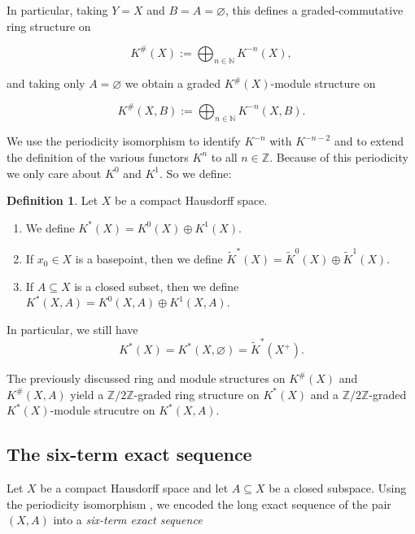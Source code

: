 \documentclass[12pt,a4paper]{amsart}
\theoremstyle{plain}
\theoremstyle{definition}
\newtheorem{defn}[thm]{Definition}
\theoremstyle{remark}
\begin{document}
In particular, taking $Y = X$ and $B = A = \varnothing$, this defines a graded-commutative ring structure on

\[ K^{\#}(X) := \bigoplus_{n \in \mathbb{N}} K^{-n}(X), \]

and taking only $A = \varnothing$ we obtain a graded $K^{\#}(X)$-module structure on

\[ K^{\#}(X,B) := \bigoplus_{n \in \mathbb{N}} K^{-n}(X,B). \]

We use the periodicity isomorphism \cite[Theorem 2.4.9]{ati67} to identify $K^{-n}$ with $K^{-n-2}$ and to extend the definition of the various functors $K^{n}$ to all $n \in \mathbb{Z}$.
Because of this periodicity we only care about $K^{0}$ and $K^{1}$.
So we define:

\begin{defn}
  Let $X$ be a compact Hausdorff space.
  \begin{enumerate}
    \item We define $K^{*}(X) = K^{0}(X) \oplus K^{1}(X)$.
    \item If $x_{0} \in X$ is a basepoint, then we define $\tilde{K}^{*}(X) = \tilde{K}^{0}(X) \oplus \tilde{K}^{1}(X)$.
    \item If $A \subseteq X$ is a closed subset, then we define $K^{*}(X,A) = K^{0}(X,A) \oplus K^{1}(X,A)$.
  \end{enumerate}
  In particular, we still have
  \[ K^{*}(X) = K^{*}(X, \varnothing) = \tilde{K}^{*}(X^{+}). \]
\end{defn}

The previously discussed ring and module structures on $K^{\#}(X)$ and $K^{\#}(X,A)$ yield a $\mathbb{Z}/2\mathbb{Z}$-graded ring structure on $K^{*}(X)$ and a $\mathbb{Z}/2\mathbb{Z}$-graded $K^{*}(X)$-module strucutre on $K^{*}(X,A)$.

\subsection{The six-term exact sequence}

Let $X$ be a compact Hausdorff space and let $A \subseteq X$ be a closed subspace.
Using the periodicity isomorphism \cite[Theorem 2.4.9]{ati67}, we encoded the long exact sequence of the pair $(X,A)$ into a \textit{six-term exact sequence}

\begin{center}
\end{center}
\end{document}
